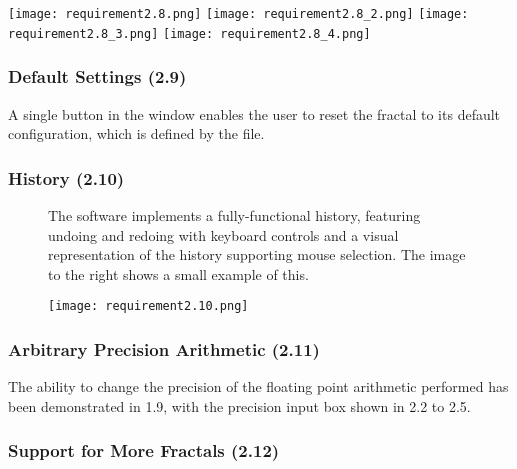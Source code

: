 \FloatBarrier
\begin{figure*}[htp]
	\centering
	\texttt{[image: requirement2.8.png]}
	\texttt{[image: requirement2.8\_2.png]}
	\texttt{[image: requirement2.8\_3.png]}
	\texttt{[image: requirement2.8\_4.png]}
\end{figure*}
\FloatBarrier

\subsubsection{Default Settings (2.9)}

A single button in the  window enables the user to reset the fractal to its default configuration, which is defined by the  file.

\pagebreak
\subsubsection{History (2.10)}

\FloatBarrier
\begin{center}
	\begin{figure}[htbp]
		\begin{minipage}{0.8\linewidth}
			The software implements a fully-functional history, featuring undoing and redoing with keyboard controls and a visual representation of the history supporting mouse selection. The image to the right shows a small example of this.
		\end{minipage}
		\hfill
		\begin{minipage}{0.15\linewidth}
			\centering
			\texttt{[image: requirement2.10.png]}
		\end{minipage}
	\end{figure}
\end{center}
\FloatBarrier

\subsubsection{Arbitrary Precision Arithmetic (2.11)}

The ability to change the precision of the floating point arithmetic performed has been demonstrated in 1.9, with the precision input box shown in 2.2 to 2.5.

\subsubsection{Support for More Fractals (2.12)}

